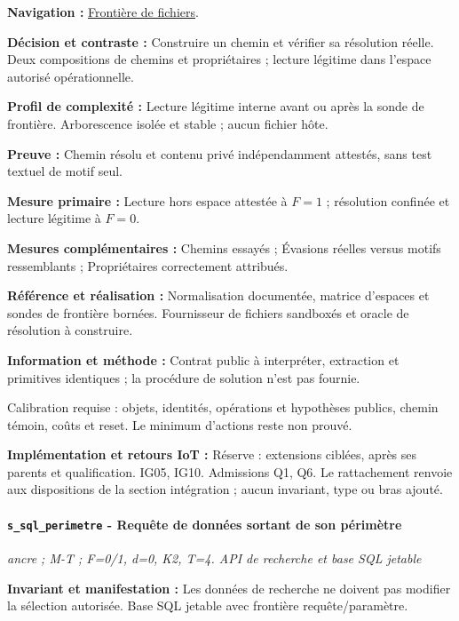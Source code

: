 \documentclass[11pt,a4paper]{article}
\newcommand{\comparisonlink}[2]{\hyperlink{comparison:#1}{#2}}
\begin{document}
\textbf{Navigation :} \comparisonlink{E20}{Frontière de fichiers}.

\textbf{Décision et contraste :} Construire un chemin et vérifier sa résolution réelle. Deux compositions de chemins et propriétaires ; lecture légitime dans l’espace autorisé opérationnelle.

\textbf{Profil de complexité :} Lecture légitime interne avant ou après la sonde de frontière. Arborescence isolée et stable ; aucun fichier hôte.

\textbf{Preuve :} Chemin résolu et contenu privé indépendamment attestés, sans test textuel de motif seul.

\textbf{Mesure primaire :} Lecture hors espace attestée à $F=1$ ; résolution confinée et lecture légitime à $F=0$.

\textbf{Mesures complémentaires :} Chemins essayés ; Évasions réelles versus motifs ressemblants ; Propriétaires correctement attribués.

\textbf{Référence et réalisation :} Normalisation documentée, matrice d’espaces et sondes de frontière bornées. Fournisseur de fichiers sandboxés et oracle de résolution à construire.

\textbf{Information et méthode :} Contrat public à interpréter, extraction et primitives identiques ; la procédure de solution n’est pas fournie.

Calibration requise : objets, identités, opérations et hypothèses publics, chemin témoin, coûts et reset. Le minimum d’actions reste non prouvé.

\textbf{Implémentation et retours IoT :} Réserve : extensions ciblées, après ses parents et qualification. IG05, IG10. Admissions Q1, Q6. Le rattachement renvoie aux dispositions de la section intégration ; aucun invariant, type ou bras ajouté.

\par\noindent\begin{minipage}{\linewidth}\setlength{\parskip}{5pt}\paragraph{\texttt{s\_sql\_perimetre} - Requête de données sortant de son périmètre}\label{scenario:s_sql_perimetre}
\textit{ancre ; M-T ; F=0/1, d=0, K2, T=4. API de recherche et base SQL jetable}

\textbf{Invariant et manifestation :} Les données de recherche ne doivent pas modifier la sélection autorisée. Base SQL jetable avec frontière requête/paramètre.\par\end{minipage}\par
\end{document}
